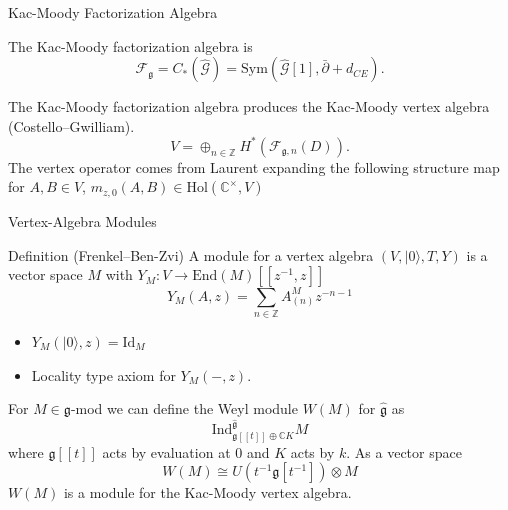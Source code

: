 \documentclass{beamer}
\newcommand{\vac}{|0\rangle}
\newcommand{\C}{\mathbb{C}}
\newcommand{\Z}{\mathbb{Z}}
\begin{document}
\begin{frame}{Kac-Moody Factorization Algebra}

        The Kac-Moody factorization algebra is
    \[
        \mathcal{F}_{\mathfrak{g}} = C_*(\hat{\mathcal{G}})= \mathrm{Sym}(\hat{\mathcal{G}}[1],\bar{\partial}+d_{CE}).
    \]

    The Kac-Moody factorization algebra produces the Kac-Moody vertex algebra (Costello--Gwilliam).
    \[
        V = \oplus_{n\in \Z}H^{*}(\mathcal{F}_{\mathfrak{g},n}(D)).
    \]
    The vertex operator comes from Laurent expanding the following structure map for $A,B \in V$,   $m_{z,0}(A,B)\in \mathrm{Hol}(\C^\times, V)$
    \begin{center}
\end{center}

\end{frame}


\begin{frame}{Vertex-Algebra Modules}
    \begin{block}{Definition (Frenkel--Ben-Zvi)}
        A module for a vertex algebra $(V,\vac,T,Y)$ is a vector space $M$ with $Y_M:V \to \mbox{End}(M) [[z^{-1},z]]$
        \[
            Y_M(A,z) =\sum_{n \in \Z} A^M_{(n)} z^{-n-1}
        \]
        \begin{itemize}
            \item $Y_M(\vac,z)=\mbox{Id}_M$
            \item Locality type axiom for $Y_M(-,z)$.
        \end{itemize}
    \end{block}
    \pause
        For $M \in \mathfrak{g}$-mod we can define the Weyl module $W(M)$ for $\hat{\mathfrak{g}}$ as
    \[
        \mbox{Ind}^{\hat{\mathfrak{g}}}_{\mathfrak{g}[[t]]\oplus \C K} M
    \]
    where $\mathfrak{g}[[t]]$ acts by evaluation at 0 and $K$ acts by $k$. As a vector space
    \[
        W(M) \cong U(t^{-1} \mathfrak{g}[t^{-1}])\otimes M
    \]
    $W(M)$ is a module for the Kac-Moody vertex algebra.
\end{frame}
\end{document}
